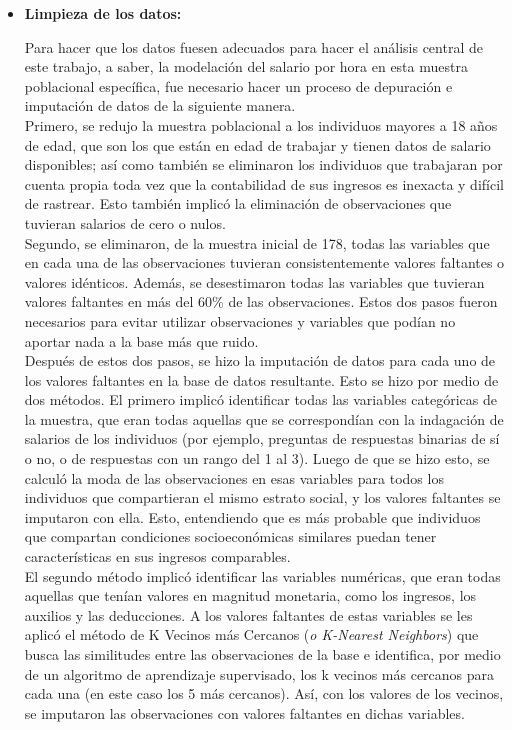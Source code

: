 \documentclass[12pt,a4paper,onecolumn]{article}
\begin{document}
\begin{itemize}
\item \textbf{Limpieza de los datos:}

Para hacer que los datos fuesen adecuados para hacer el análisis central de este trabajo, a saber, la modelación del salario por hora en esta muestra poblacional específica, fue necesario hacer un proceso de depuración e imputación de datos de la siguiente manera.\\ 

Primero, se redujo la muestra poblacional a los individuos mayores a 18 años de edad, que son los que están en edad de trabajar y tienen datos de salario disponibles; así como también se eliminaron los individuos que trabajaran por cuenta propia toda vez que la contabilidad de sus ingresos es inexacta y difícil de rastrear. Esto también implicó la eliminación de observaciones que tuvieran salarios de cero o nulos.\\ 

Segundo, se eliminaron, de la muestra inicial de 178, todas las variables que en cada una de las observaciones tuvieran consistentemente valores faltantes o valores idénticos. Además, se desestimaron todas las variables que tuvieran valores faltantes en más del 60\% de las observaciones. Estos dos pasos fueron necesarios para evitar utilizar observaciones y variables que podían no aportar nada a la base más que ruido.\\ 

Después de estos dos pasos, se hizo la imputación de datos para cada uno de los valores faltantes en la base de datos resultante. Esto se hizo por medio de dos métodos. El primero implicó identificar todas las variables categóricas de la muestra, que eran todas aquellas que se correspondían con la indagación de salarios de los individuos (por ejemplo, preguntas de respuestas binarias de sí o no, o de respuestas con un rango del 1 al 3). Luego de que se hizo esto, se calculó la moda de las observaciones en esas variables para todos los individuos que compartieran el mismo estrato social, y los valores faltantes se imputaron con ella. Esto, entendiendo que es más probable que individuos que compartan condiciones socioeconómicas similares puedan tener características en sus ingresos comparables.\\ 

El segundo método implicó identificar las variables numéricas, que eran todas aquellas que tenían valores en magnitud monetaria, como los ingresos, los auxilios y las deducciones. A los valores faltantes de estas variables se les aplicó el método de K Vecinos más Cercanos (\textit{o K-Nearest Neighbors}) que busca las similitudes entre las observaciones de la base e identifica, por medio de un algoritmo de aprendizaje supervisado, los k vecinos más cercanos para cada una (en este caso los 5 más cercanos). Así, con los valores de los vecinos, se imputaron las observaciones con valores faltantes en dichas variables.\\ 


\end{itemize}
\end{document}
